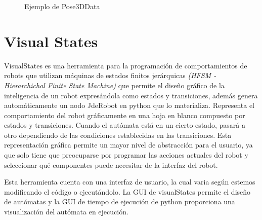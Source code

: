 \begin{figure}[H]
 \centering
 \caption{Ejemplo de Pose3DData}
 \label{f:Ejemplo de Pose3DData}
\end{figure} 

\section{Visual States}
\hspace{1cm} VisualStates es una herramienta para la programación de comportamientos de robots que utilizan máquinas de estados finitos jerárquicas \textit{(HFSM - Hierarchichal Finite State Machine)} que permite el diseño gráfico de la inteligencia de un robot expresándola como estados y transiciones, además genera automáticamente un nodo JdeRobot en python que lo materializa. Representa el comportamiento del robot gráficamente en una hoja en blanco compuesto por estados y transiciones. Cuando el autómata está en un cierto estado, pasará a otro dependiendo de las condiciones establecidas en las transiciones. Esta representación gráfica permite un mayor nivel de abstracción para el usuario, ya que solo tiene que preocuparse por programar las acciones actuales del robot y seleccionar qué componentes puede necesitar de la interfaz del robot.

\hspace{1cm} Esta herramienta cuenta con una interfaz de usuario, la cual varia según estemos modificando el código o ejecutándolo. La GUI de visualStates permite el diseño de autómatas y la GUI de tiempo de ejecución de python proporciona una visualización del autómata en ejecución. 
\\

